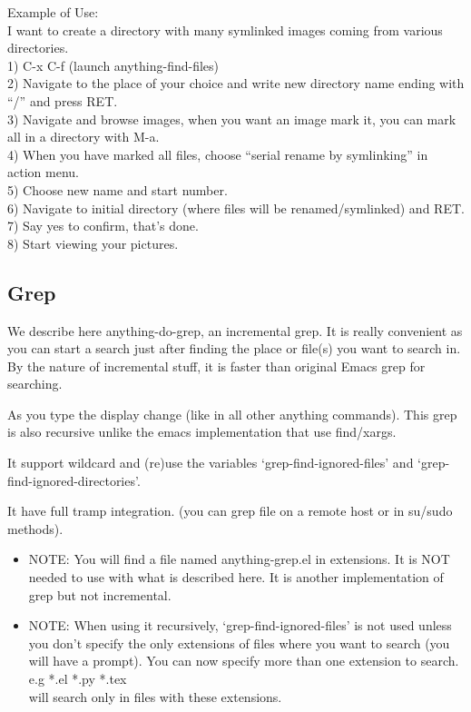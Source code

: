 \documentclass[a4paper,11pt]{article}
\begin{document}
Example of Use:\\
I want to create a directory with many symlinked images coming from various directories.\\
1) C-x C-f (launch anything-find-files)\\
2) Navigate to the place of your choice and write new directory name ending with ``/'' and press RET.\\
3) Navigate and browse images, when you want an image mark it, you can mark all in a directory with M-a.\\
4) When you have marked all files, choose ``serial rename by symlinking'' in action menu.\\
5) Choose new name and start number.\\
6) Navigate to initial directory (where files will be renamed/symlinked) and RET.\\
7) Say yes to confirm, that's done.\\
8) Start viewing your pictures.\\

\subsection{Grep}
\label{sec:grep}
We describe here anything-do-grep, an incremental grep.
It is really convenient as you can start a search just after finding the place or file(s) you want to search in.
By the nature of incremental stuff, it is faster than original Emacs grep for searching.

As you type the display change (like in all other anything commands).
This grep is also recursive unlike the emacs implementation that use find/xargs.

It support wildcard and (re)use the variables `grep-find-ignored-files'
and `grep-find-ignored-directories'.

It have full tramp integration.
(you can grep file on a remote host or in su/sudo methods).

\begin{itemize}
\item NOTE: 
You will find a file named anything-grep.el in extensions.
It is NOT needed to use with what is described here.
It is another implementation of grep but not incremental.
\end{itemize}


\begin{itemize}
\item NOTE:
When using it recursively, `grep-find-ignored-files' is not used unless you don't specify
the only extensions of files where you want to search (you will have a prompt).
You can now specify more than one extension to search.\\
e.g *.el *.py *.tex \\
will search only in files with these extensions.
\end{itemize}
\end{document}
